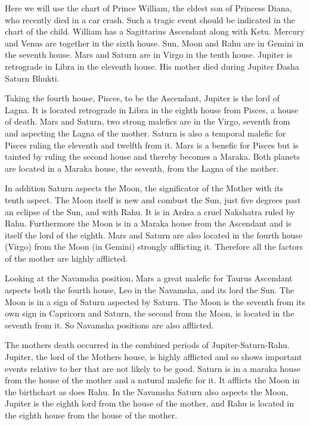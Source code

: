  

Here we will use the chart of Prince William, the eldest son of Princess Diana, who recently died in a car crash. Such a tragic event should be indicated in the chart of the child. William has a Sagittarius Ascendant along with Ketu. Mercury and Venus are together in the sixth house. Sun, Moon and Rahu are in Gemini in the seventh house. Mars and Saturn are in Virgo in the tenth house. Jupiter is retrograde in Libra in the eleventh house. His mother died during Jupiter Dasha Saturn Bhukti.

 



 

Taking the fourth house, Pisces, to be the Ascendant, Jupiter is the lord of Lagna. It is located retrograde in Libra in the eighth house from Pisces, a house of death. Mars and Saturn, two strong malefics are in the Virgo, seventh from and aspecting the Lagna of the mother. Saturn is also a temporal malefic for Pisces ruling the eleventh and twelfth from it. Mars is a benefic for Pisces but is tainted by ruling the second house and thereby becomes a Maraka. Both planets are located in a Maraka house, the seventh, from the Lagna of the mother.

 

In addition Saturn aspects the Moon, the significator of the Mother with its tenth aspect. The Moon itself is new and combust the Sun, just five degrees past an eclipse of the Sun, and with Rahu. It is in Ardra a cruel Nakshatra ruled by Rahu. Furthermore the Moon is in a Maraka house from the Ascendant and is itself the lord of the eighth. Mars and Saturn are also located in the fourth house (Virgo) from the Moon (in Gemini) strongly afflicting it. Therefore all the factors of the mother are highly afflicted.

 

Looking at the Navamsha position, Mars a great malefic for Taurus Ascendant aspects both the fourth house, Leo in the Navamsha, and its lord the Sun. The Moon is in a sign of Saturn aspected by Saturn. The Moon is the seventh from its own sign in Capricorn and Saturn, the second from the Moon, is located in the seventh from it. So Navamsha positions are also afflicted.

 

The mothers death occurred in the combined periods of Jupiter-Saturn-Rahu. Jupiter, the lord of the Mothers house, is highly afflicted and so shows important events relative to her that are not likely to be good. Saturn is in a maraka house from the house of the mother and a natural malefic for it. It afflicts the Moon in the birthchart as does Rahu. In the Navamsha Saturn also aspects the Moon, Jupiter is the eighth lord from the house of the mother, and Rahu is located in the eighth house from the house of the mother.

